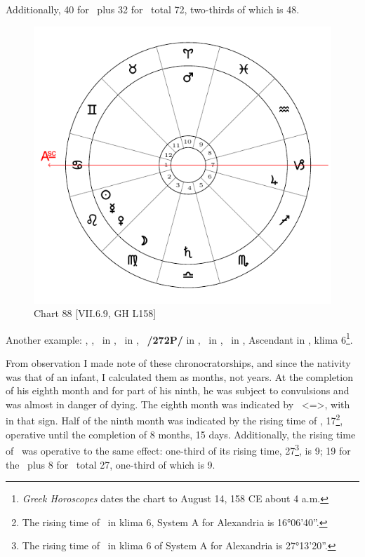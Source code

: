 Additionally, 40 for \Virgo\, plus 32 for \Sagittarius\, total 72, two-thirds of which is 48.

\newpage

\begin{figure}
\centering
\includegraphics[width=.68\textwidth]{charts/7_6_09}
\caption{Chart 88 [VII.6.9, GH L158] }
\label{fig:chart88}
\end{figure} 

Another example: \Sun, \Mercury, \Venus\, in \Leo, \Moon\, in \Virgo, \Saturn\, \textbf{/272P/} in \Libra, \Jupiter\, in \Capricorn, \Mars\, in \Aries, Ascendant in \Cancer, klima 6\footnote{\textit{Greek Horoscopes} dates the chart to August 14, 158 CE about 4 a.m.}.

From observation I made note of these chronocratorships, and since the nativity was that of an infant, \mndl I calculated them as months, not years. At the completion of his eighth month and for part of his ninth, he was subject to convulsions and was almost in danger of dying. The eighth month was indicated by \Libra\, <=\Venus>, with \Saturn\, in that sign. Half of the ninth month was indicated by the rising time of \Aries, 17\footnote{The rising time of \Aries\, in klima 6, System A for Alexandria is 16°06'40''.}, operative until the completion of 8 months, 15 days. Additionally, the rising time of \Capricorn\, was operative to the same effect: one-third of its rising time, 27\footnote{The rising time of \Capricorn\, in klima 6 of System A for Alexandria is 27°13'20''.}, is 9; 19 for the \Sun\, plus 8 for \Venus\, total 27, one-third of which is 9. 

